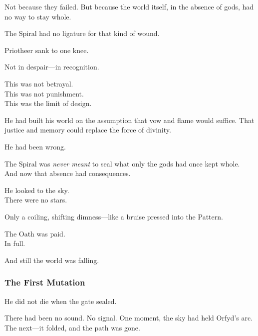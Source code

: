 \documentclass[12pt]{article}
\begin{document}
\vspace{0.5em}
Not because they failed. But because the world itself, in the absence of gods, had no way to stay whole.

\vspace{0.5em}
The Spiral had no ligature for that kind of wound.

\vspace{0.5em}
Priotheer sank to one knee.

\vspace{0.5em}
Not in despair---in recognition.

\vspace{0.5em}
This was not betrayal.\\
This was not punishment.\\
This was the limit of design.

\vspace{0.5em}
He had built his world on the assumption that vow and flame would suffice. That justice and memory could replace the force of divinity.

\vspace{0.5em}
He had been wrong.

\vspace{0.5em}
The Spiral was \textit{never meant} to seal what only the gods had once kept whole.\\
And now that absence had consequences.

\vspace{0.5em}
He looked to the sky.\\
There were no stars.

\vspace{0.5em}
Only a coiling, shifting dimness---like a bruise pressed into the Pattern.

\vspace{0.5em}
The Oath was paid.\\
In full.

\vspace{0.5em}
And still the world was falling.

\dotfill

\subsubsection*{The First Mutation}

He did not die when the gate sealed.

\vspace{0.5em}
There had been no sound. No signal. One moment, the sky had held Orfyd’s arc. The next---it folded, and the path was gone.
\end{document}
